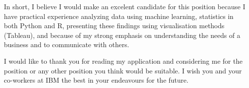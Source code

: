 \documentclass[11pt, a4paper]{awesome-cv}
\begin{document}
\begin{cvletter}
In short, I believe I would make an excelent candidate for this position because I
have practical experience analyzing data using machine learning, statistics
in both Python and R, presenting these findings using visualisation methods (Tableau),
and because of my strong emphasis on understanding the needs of a business and to
communicate with others.

I would like to thank you for reading my application and considering me for the
position or any other position you think would be suitable. I wish you and your
co-workers at IBM the best in your endeavours for the future.

\end{cvletter}

\makeletterclosing
\end{document}
